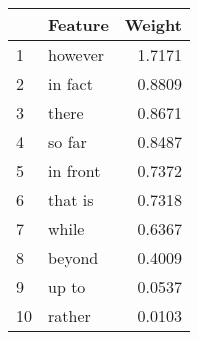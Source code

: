 \begin{tabular}{llr}
\toprule
{} &   Feature &  Weight \\
\midrule
1  &   however &  1.7171 \\
2  &   in fact &  0.8809 \\
3  &     there &  0.8671 \\
4  &    so far &  0.8487 \\
5  &  in front &  0.7372 \\
6  &   that is &  0.7318 \\
7  &     while &  0.6367 \\
8  &    beyond &  0.4009 \\
9  &     up to &  0.0537 \\
10 &    rather &  0.0103 \\
\bottomrule
\end{tabular}
